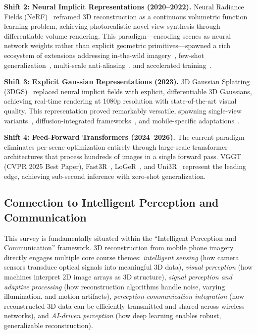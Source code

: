 \documentclass[journal]{IEEEtran}
\begin{document}
\textbf{Shift 2: Neural Implicit Representations (2020--2022).} Neural Radiance Fields (NeRF)~\cite{nerf} reframed 3D reconstruction as a continuous volumetric function learning problem, achieving photorealistic novel view synthesis through differentiable volume rendering. This paradigm---encoding scenes as neural network weights rather than explicit geometric primitives---spawned a rich ecosystem of extensions addressing in-the-wild imagery~\cite{nerfw}, few-shot generalization~\cite{pixelnerf}, multi-scale anti-aliasing~\cite{mipnerf}, and accelerated training~\cite{instantngp}.

\textbf{Shift 3: Explicit Gaussian Representations (2023).} 3D Gaussian Splatting (3DGS)~\cite{3dgs} replaced neural implicit fields with explicit, differentiable 3D Gaussians, achieving real-time rendering at 1080p resolution with state-of-the-art visual quality. This representation proved remarkably versatile, spawning single-view variants~\cite{tgs,gamba}, diffusion-integrated frameworks~\cite{diffusiongs}, and mobile-specific adaptations~\cite{tmo,mobilebrick}.

\textbf{Shift 4: Feed-Forward Transformers (2024--2026).} The current paradigm eliminates per-scene optimization entirely through large-scale transformer architectures that process hundreds of images in a single forward pass. VGGT~\cite{vggt} (CVPR 2025 Best Paper), Fast3R~\cite{fast3r}, LoGeR~\cite{loger}, and Uni3R~\cite{uni3r} represent the leading edge, achieving sub-second inference with zero-shot generalization.

\subsection{Connection to Intelligent Perception and Communication}

This survey is fundamentally situated within the ``Intelligent Perception and Communication'' framework. 3D reconstruction from mobile phone imagery directly engages multiple core course themes: \textit{intelligent sensing} (how camera sensors transduce optical signals into meaningful 3D data), \textit{visual perception} (how machines interpret 2D image arrays as 3D structure), \textit{signal perception and adaptive processing} (how reconstruction algorithms handle noise, varying illumination, and motion artifacts), \textit{perception-communication integration} (how reconstructed 3D data can be efficiently transmitted and shared across wireless networks), and \textit{AI-driven perception} (how deep learning enables robust, generalizable reconstruction).
\end{document}

